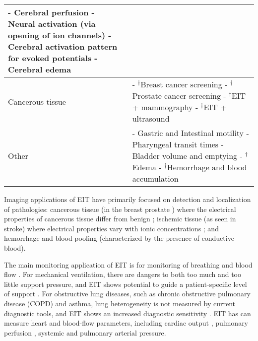 \documentclass[12pt]{article} \usepackage[margin=3cm]{geometry} \usepackage[margin=20pt,font=small,labelfont=bf]{caption}\def\TBLWIDA{35mm}\def\TBLWIDB{95mm}
\begin{document}
\begin{table}
\begin{tabular}{p{\TBLWIDA}p{\TBLWIDB}}
      \newline
 - Cerebral perfusion \cite{Adler2017Cerebral}
          \newline
 - Neural activation (via opening of ion channels) \cite{Aristovich2014Neural}
          \newline
 - Cerebral activation pattern for evoked potentials
          \newline
 - Cerebral edema
\\
    \hline
Cancerous tissue &
 - $^\dagger$Breast cancer screening \cite{Assenheimer2001TScan,Cherepenin2001Breast} 
      \newline
 - $^\dagger$Prostate cancer screening \cite{Borsic2009Prostate, Halter2007Postate}
      \newline
 - $^\dagger$EIT + mammography \cite{Choi2007Mammography}
      \newline
 - $^\dagger$EIT + ultrasound \cite{Soleimani2006Ultrasound}
\\
    \hline
Other &
 - Gastric and Intestinal motility \cite{Mangnall1987}
       \newline
 - Pharyngeal transit times \cite{Mangnall1987}
       \newline
 - Bladder volume and emptying \cite{Leonhardt2011Bladder}
       \newline
 - $^\dagger$Edema \cite{Abboud1995Peripheral, Newell1996}
       \newline
 - $^\dagger$Hemorrhage and blood accumulation \cite{Sadleir2009blood}
\end{tabular}
\end{table}

Imaging applications of EIT have primarily focused on detection
and localization of pathologies: cancerous tissue (in the breast
\cite{Assenheimer2001TScan,Cherepenin2001Breast} prostate
\cite{Borsic2009Prostate}) where the electrical properties of cancerous tissue
differ from benign \cite{Jossinet1998Breast}; ischemic tissue (as seen in
stroke) where electrical properties vary with ionic concentrations
\cite{Holder1992Ischaemia}; and hemorrhage and blood pooling (characterized by
the presence of conductive blood).

The main monitoring application of EIT is for monitoring of breathing
and blood flow
 \cite{Frerichs2017Chest}. For mechanical ventilation,
there are dangers to both too much and too little
support pressure, and EIT shows potential to guide a
patient-specific level of support \cite{Wolf2013Mechanical}.
For obstructive lung diseases, such as chronic obstructive pulmonary disease
(COPD) and asthma, lung heterogeneity 
is not measured by current diagnostic
tools, and EIT shows an increased diagnostic sensitivity
\cite{Vogt2016Heterogeneity}.
EIT has can measure 
heart and blood-flow parameters, including 
cardiac output \cite{vonkNoordegraaf2000},
pulmonary perfusion \cite{Frerichs2002Perfusion},
systemic \cite{Sola2011Central} and pulmonary
arterial \cite{Proenca2016Noninvasive} pressure.
\end{document}
